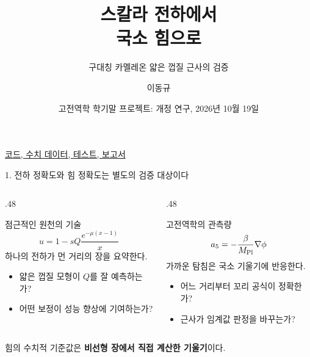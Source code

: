 \documentclass[10pt,aspectratio=169]{beamer}
\title{스칼라 전하에서\\국소 힘으로}
\subtitle{구대칭 카멜레온 얇은 껍질 근사의 검증}
\author{이동규}
\institute{서울대학교 물리천문학부}
\date{고전역학 학기말 프로젝트: 개정 연구, 2026년 10월 19일}
\begin{document}
\begingroup
{}
\begin{frame}[plain]
 \titlepage
 \centering\scriptsize
 \href{https://github.com/Lasqui-Ponto/Mechanics_Term_Project/tree/agent/improve-chameleon-project/Thin_Shell_Study}{\color{white!80}코드, 수치 데이터, 테스트, 보고서}
\end{frame}
\endgroup

\begin{frame}{1. 전하 정확도와 힘 정확도는 별도의 검증 대상이다}
 \begin{columns}[T,onlytextwidth]
 \begin{column}{.48\textwidth}
  \begin{block}{점근적인 원천의 기술}
   \[u=1-sQ\frac{e^{-\mu(x-1)}}x\]
   하나의 전하가 먼 거리의 장을 요약한다.
  \end{block}
  \begin{itemize}
   \item 얇은 껍질 모형이 $Q$를 잘 예측하는가?
   \item 어떤 보정이 성능 향상에 기여하는가?
  \end{itemize}
 \end{column}
 \begin{column}{.48\textwidth}
  \begin{block}{고전역학의 관측량}
   \[a_5=-\frac{\beta}{M_{\rm Pl}}\nabla\phi\]
   가까운 탐침은 국소 기울기에 반응한다.
  \end{block}
  \begin{itemize}
   \item 어느 거리부터 꼬리 공식이 정확한가?
   \item 근사가 임계값 판정을 바꾸는가?
  \end{itemize}
 \end{column}
 \end{columns}
 \vfill\centering\small
 힘의 수치적 기준값은 \textbf{비선형 장에서 직접 계산한 기울기}이다.
\end{frame}
\end{document}
